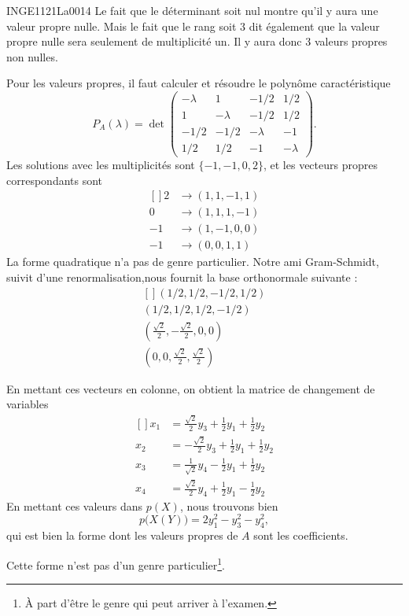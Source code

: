 \begin{corrige}{INGE1121La0014}
	Le fait que le déterminant soit nul montre qu'il y aura une valeur propre nulle. Mais le fait que le rang soit $3$ dit également que la valeur propre nulle sera seulement de multiplicité un. Il y aura donc $3$ valeurs propres non nulles.

	Pour les valeurs propres, il faut calculer et résoudre le polynôme caractéristique
	\begin{equation}
		P_A(\lambda)=\det
			\begin{pmatrix}
				 -\lambda	&	1	&	-1/2	&	1/2	\\
				 1	&	-\lambda	&	-1/2	&	1/2	\\
				 -1/2	&	-1/2	&	-\lambda	&	-1	\\ 
				 1/2	&	1/2	&	-1	&	-\lambda	 
			 \end{pmatrix}.
	\end{equation}
	Les solutions avec les multiplicités sont $\{ -1,-1,0,2 \}$, et les vecteurs propres correspondants sont
	\begin{equation}
		\begin{aligned}[]
			2 &\to (1, 1, -1, 1)\\
			0 &\to (1, 1, 1, -1)\\
			-1 &\to (1, -1, 0, 0)\\
			-1 &\to (0, 0, 1, 1)
		\end{aligned}
	\end{equation}
	La forme quadratique n'a pas de genre particulier. Notre ami Gram-Schmidt, suivit d'une renormalisation,nous fournit la base orthonormale suivante :
	\begin{equation}
		\begin{aligned}[]
			(1/2, 1/2, -1/2, 1/2)\\
			(1/2, 1/2, 1/2, -1/2)\\
			(\frac{ \sqrt{2}}{2}, -\frac{ \sqrt{2} }{2}, 0, 0)\\
			(0, 0, \frac{ \sqrt{2} }{2}, \frac{ \sqrt{2} }{2})
		\end{aligned}
	\end{equation}

	En mettant ces vecteurs en colonne, on obtient la matrice de changement de variables
	\begin{equation}
		\begin{aligned}[]
			x_1 &= \frac{ \sqrt{2} }{2}y_3 + \frac{ 1 }{2}y_1 + \frac{ 1 }{2}y_2\\
			x_2 &= -\frac{ \sqrt{2} }{2}y_3 + \frac{ 1 }{2}y_1 + \frac{ 1 }{2}y_2\\
			x_3 &= \frac{1}{ \sqrt{2}}y_4 - \frac{ 1 }{2}y_1 + \frac{ 1 }{2}y_2\\
			x_4 &= \frac{ \sqrt{2} }{2}y_4 + \frac{ 1 }{2}y_1 - \frac{ 1 }{2}y_2
		\end{aligned}
	\end{equation}
	En mettant ces valeurs dans $p(X)$, nous trouvons bien
	\begin{equation}
		p\big( X(Y) \big)=2y_1^2 - y_3^2 - y_4^2,
	\end{equation}
	qui est bien la forme dont les valeurs propres de $A$ sont les coefficients.

	Cette forme n'est pas d'un genre particulier\footnote{À part d'être le genre qui peut arriver à l'examen.}.

\end{corrige}

